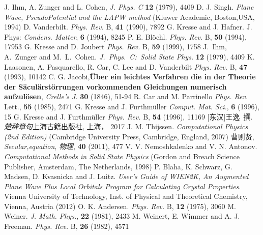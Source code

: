 {{\begin{thebibliography}{99}
{	\textrm{J. Ihm, A. Zunger and L. Cohen, {\textit{J. Phys. C}} \textbf{12} (1979), 4409}
        \textrm{D. J. Singh. \textit{Plane Wave, PseudoPotential and the LAPW method} (Kluwer Academic, Boston,USA, 1994)}					%
	\textrm{D. Vanderbilt. \textit{Phys. Rev.} B, \textbf{41} (1990), 7892} 
	\textrm{G. Kresse and J. Hafner. J. Phys: \textit{Condens. Matter}, \textbf{6} (1994), 8245}
	\textrm{P. E. Bl\"ochl. \textit{Phys. Rev.} B, \textbf{50} (1994), 17953}
	\textrm{G. Kresse and D. Joubert \textit{Phys. Rev.} B, \textbf{59} (1999), 1758}
\textrm{J.~Ihm, A.~Zunger and M.~L.~Cohen. \textit{J.~Phys.~C:~Solid State Phys.} \textbf{12} (1979), 4409}
\textrm{K. Laasonen, A. Pasquarello, R. Car, C. Lee and D. Vanderbilt \textit{Phys. Rev.} B, \textbf{47} (1993), 10142}
	\textrm{C. G. Jacobi,\textbf{\"Uber ein leichtes Verfahren die in der Theorie der S\"acul\"arst\"orrungen vorkommenden Gleichungen numerisch aufzul\"osen}, \textit{Crelle's J.} \textbf{30} (1846), 51-94}
	\textrm{R. Car and M. Parrinello \textit{Phys. Rev.} Lett., \textbf{55} (1985), 2471}
	\textrm{G. Kresse and J. Furthm\"uller \textit{Comput. Mat. Sci.}, \textbf{6} (1996), 15}
	\textrm{G. Kresse and J. Furthm\"uller \textit{Phys. Rev.} B, \textbf{54} (1996), 11169}
	[东汉]王逸~撰. \textit{楚辞章句}\:上海古籍出版社, 上海， 2017
	\textrm{J. M. Thijssen. \textit{Computational Physics (2nd Edition)} (Cambridge University Press, Cambridge, England, 2007)}
	曹则贤, \textit{Secular,equation}, \textit{物理}, \textbf{40} \textrm{(2011), 477}
	\textrm{V. V. Nemoshkalenko and V. N. Antonov. \textit{Computational Methods in Solid State Physics} (Gordon and Breach Science Publisher, Amsterdam, The Netherlands, 1998)}
	\textrm{P. Blaha, K. Schwarz, G. Madsen, D. Kvasnicka and J. Luitz. \textit{User's Guide of WIEN2K, An Augmented Plane Wave Plus Local Orbitals Program for Calculating Crystal Properties}. Vienna University of Technology, Inst. of Physical and Theoretical Chemistry, Vienna, Austria (2012)}
	\textrm{O. K. Andersen. \textit{Phys. Rev.} B, \textbf{12} (1975), 3060}
	\textrm{M. Weiner. \textit{J. Math. Phys.}, \textbf{22} (1981), 2433}
	\textrm{M. Weinert, E. Wimmer and A. J. Freeman. \textit{Phys. Rev.} B, \textbf{26} (1982), 4571}
}
\end{thebibliography}}}
